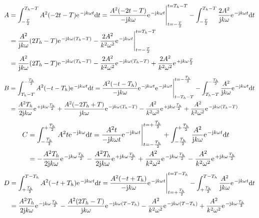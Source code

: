 \documentclass[11pt,a4paper,DIV=12]{scrartcl}
\newcommand{\diff}{\mathrm{d}}
\begin{document}
\begin{align}
	A&=\int_{-\frac{T}{2}}^{T_h-T}A^2(-2t-T)\e^{-\im k \omega t}\diff t=\frac{A^2(-2t-T)}{-\im k \omega }\e^{-\im k \omega t}\Bigg |_{t=-\frac{T}{2}}^{t=T_h-T}-\int_{-\frac{T}{2}}^{T_h-T}\frac{2A^2}{\im k \omega}\e^{-\im k \omega t}\diff t\nonumber \\
	&=\frac{A^2}{\im k \omega}(2T_h-T)\e^{-\im k \omega (T_h-T)}-\frac{2A^2}{k^2\omega^2}\e^{-\im k \omega t}\Bigg |_{t=-\frac{T
		}{2}}^{t=T_h-T}\nonumber \\
	&=\frac{A^2}{\im k \omega}(2T_h-T)\e^{-\im k \omega (T_h-T)}-\frac{2A^2}{k^2\omega^2}\e^{-\im k \omega (T_h-T)}+\frac{2A^2}{k^2\omega^2}\e^{+\im k \omega \frac{T}{2}}
\end{align}
\begin{align}
	B&=\int_{T_h-T}^{-\frac{T_h}{2}}A^2(-t-T_h)\e^{-\im k \omega t}\diff t=\frac{A^2(-t-T_h)}{-\im k \omega}\e^{-\im k \omega t}\e^{-\im k \omega t}\Bigg |_{t=T_h-T}^{t=-\frac{T_h}{2}}-\int_{T_h-T}^{-\frac{T_h}{2}}\frac{A^2}{\im k \omega}\e^{-\im k \omega t}\diff t\nonumber \\
	&=\frac{A^2T_h}{2\im k \omega}\e^{+\im k \omega \frac{T_h}{2}}+\frac{A^2(-2T_h+T)}{\im k \omega}\e^{-\im k \omega (T_h-T)}-\frac{A^2}{k^2\omega^2}\e^{+\im k \omega \frac{T_h}{2}}+\frac{A^2}{k^2\omega^2}\e^{-\im k \omega (T_h-T)}
\end{align}
\begin{align}
	C&=\int_{-\frac{T_h}{2}}^{+\frac{T_h}{2}}A^2t\e^{-\im k \omega }\diff t=\frac{A^2t}{-\im k \omega t}\e^{-\im k \omega t}\Bigg |_{t=-\frac{T_h}{2}}^{t=+\frac{T_h}{2}}+\int_{-\frac{T_h}{2}}^{+\frac{T_h}{2}}\frac{A^2}{\im k \omega}\e^{-\im k \omega t}\diff t\nonumber \\
	&=-\frac{A^2T_h}{2\im k \omega}\e^{-\im k \omega \frac{T_h}{2}}-\frac{A^2T_h}{2\im k \omega}\e^{+\im k \omega \frac{T_h}{2}}+\frac{A^2}{k^2\omega^2}\e^{-\im k \omega \frac{T_h}{2}}-\frac{A^2}{k^2\omega^2}\e^{+\im k \omega \frac{T_h}{2}}
\end{align}
\begin{align}
	D&=\int_{+\frac{T_h}{2}}^{T-T_h}A^2(-t+T_h)\e^{-\im k \omega t}\diff t=\frac{A^2(-t+T_h)}{-\im k \omega}\e^{-\im k \omega t}\Bigg |_{t=+\frac{T_h}{2}}^{t=T-T_h}-\int_{+\frac{T_h}{2}}^{T-T_h}\frac{A^2}{\im k \omega}\e^{-\im k \omega t}\diff t\nonumber \\
	&=\frac{A^2T_h}{2\im k \omega}\e^{-\im k \omega \frac{T_h}{2}}-\frac{A^2(2T_h-T)}{\im k \omega}\e^{-\im k \omega (T-T_h)}-\frac{A^2}{k^2\omega^2}\e^{-\im k \omega (T-T_h)}+\frac{A^2}{ k^2 \omega^2}\e^{-\im k \omega \frac{T_h}{2}}
\end{align}
\end{document}
